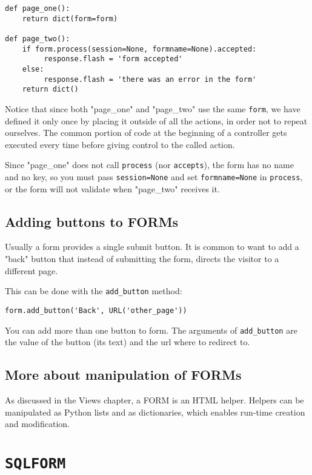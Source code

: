 \documentclass[justified,sixbynine,notoc]{tufte-book}
\def\ft{\small\tt}
\def\inxx#1{\index{#1}}
\begin{document}
\begin{fullwidth}
\begin{lstlisting}
def page_one():
    return dict(form=form)

def page_two():
    if form.process(session=None, formname=None).accepted:
         response.flash = 'form accepted'
    else:
         response.flash = 'there was an error in the form'
    return dict()
\end{lstlisting}

Notice that since both "page\_one" and "page\_two" use the same {\ft form}, we have defined it only once by placing it outside of all the actions, in order not to repeat ourselves. The common portion of code at the beginning of a controller gets executed every time before giving control to the called action.

Since "page\_one" does not call {\ft process} (nor {\ft accepts}), the form has no name and no key, so you must pass  {\ft session=None} and set {\ft formname=None} in {\ft process}, or the form will not validate when "page\_two" receives it.

\goodbreak\subsection{Adding buttons to FORMs}

Usually a form provides a single submit button. It is common to want to add a "back" button that instead of submitting the form, directs the visitor to a different page.

\inxx{add\_button}

This can be done with the {\ft add\_button} method:

\begin{lstlisting}
form.add_button('Back', URL('other_page'))
\end{lstlisting}

You can add more than one button to form. The arguments of {\ft add\_button} are the value of the button (its text) and the url where to redirect to.

\goodbreak\subsection{More about manipulation of FORMs}

As discussed in the Views chapter, a FORM is an HTML helper. Helpers can be manipulated as Python lists and as dictionaries, which enables run-time creation and modification.

\goodbreak\section{{\ft SQLFORM}}


\end{fullwidth}
\end{document}
